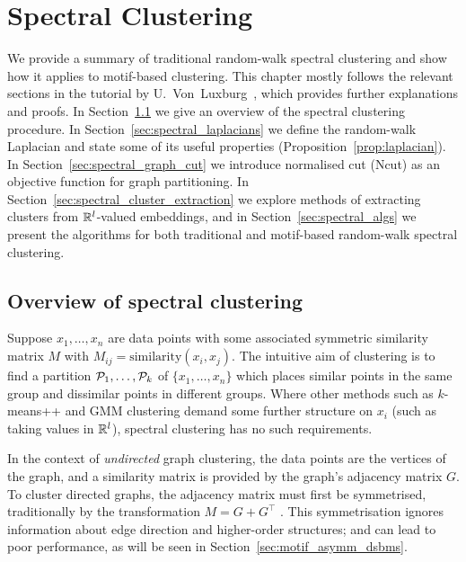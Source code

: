 \chapter{Spectral Clustering} \label{chap:spectral}

We provide a summary of traditional random-walk spectral clustering and show how it applies to motif-based clustering.
This chapter mostly follows the relevant sections in the tutorial by U.~Von~Luxburg~\cite{von2007tutorial}, which provides further explanations and proofs.
In Section~\ref{sec:spectral_overview} we give an overview of the spectral clustering procedure.
In Section~\ref{sec:spectral_laplacians} we define the random-walk Laplacian and state some of its useful properties (Proposition~\ref{prop:laplacian}).
In Section~\ref{sec:spectral_graph_cut} we introduce normalised cut (Ncut) as an objective function for graph partitioning.
In Section~\ref{sec:spectral_cluster_extraction} we explore methods of extracting clusters from $\mathbb{R}^l$-valued embeddings, and in Section~\ref{sec:spectral_algs} we present the algorithms for both traditional and motif-based random-walk spectral clustering.











\section{Overview of spectral clustering} \label{sec:spectral_overview}

Suppose $x_1, \ldots, x_n$ are data points with some associated symmetric similarity matrix $M$ with ${M_{ij} = \mathrm{similarity}(x_i,x_j)}$.
The intuitive aim of clustering is to find a partition $\mathcal{P}_1, \ldots, \mathcal{P}_k$ of $\{ x_1, \ldots, x_n \}$ which places similar points in the same group and dissimilar points in different groups.
Where other methods such as $k$-means++  \cite{arthur2007k} and GMM clustering \cite{duda1973pattern} demand some further structure on $x_i$ (such as taking values in $\mathbb{R}^l$), spectral clustering has no such requirements.

In the context of \emph{undirected} graph clustering, the data points are the vertices of the graph, and a similarity matrix is provided by the graph's adjacency matrix $G$.
To cluster directed graphs, the adjacency matrix must first be symmetrised, traditionally by the transformation $M = G + G^\top$ \cite{Meila2007ClusteringBW}.
This symmetrisation ignores information about edge direction and higher-order structures; and can lead to poor performance, as will be seen in Section~\ref{sec:motif_asymm_dsbms}.

